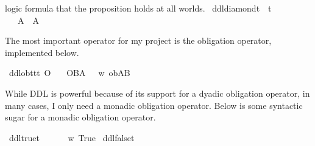 \begin{isabellebody}
{logic formula that the proposition holds at all worlds.%
}\isanewline
{}\isamarkupfalse%
\ ddldiamond{\isacharcolon}{\isacharcolon}{\isachardoublequoteopen}t\ {\isasymRightarrow}\ t{\isachardoublequoteclose}\ {\isacharparenleft}{\isachardoublequoteopen}{\isasymdiamond}{\isachardoublequoteclose}{\isacharparenright}\isanewline
\ \ \ {\isachardoublequoteopen}{\isasymdiamond}A\ {\isasymequiv}\ \isactrlbold {\isasymnot}{\isacharparenleft}{\isasymbox}{\isacharparenleft}\isactrlbold {\isasymnot}A{\isacharparenright}{\isacharparenright}{\isachardoublequoteclose}\isanewline
%
%
\begin{isamarkuptext}%
The most important operator for my project is the obligation operator, implemented below.%
\end{isamarkuptext}\isamarkuptrue%
\isamarkupfalse%
\ ddlob{\isacharcolon}{\isacharcolon}{\isachardoublequoteopen}t{\isasymRightarrow}t{\isasymRightarrow}t{\isachardoublequoteclose}\ {\isacharparenleft}{\isachardoublequoteopen}O{\isacharbraceleft}{\isacharunderscore}{\isacharbar}{\isacharunderscore}{\isacharbraceright}{\isachardoublequoteclose}{\isacharparenright}\isanewline
\ \ \ {\isachardoublequoteopen}O{\isacharbraceleft}B{\isacharbar}A{\isacharbraceright}\ {\isasymequiv}\ {\isasymlambda}\ w{\isachardot}\ ob{\isacharparenleft}A{\isacharparenright}{\isacharparenleft}B{\isacharparenright}{\isachardoublequoteclose}\isanewline
%
\isanewline
%
\begin{isamarkuptext}%
While DDL is powerful because of its support for a dyadic obligation operator, in many cases, 
I only need a monadic obligation operator. Below is some syntactic sugar for a monadic obligation operator.%
\end{isamarkuptext}\isamarkuptrue%
\isamarkupfalse%
\ ddltrue{\isacharcolon}{\isacharcolon}{\isachardoublequoteopen}t{\isachardoublequoteclose}\ {\isacharparenleft}{\isachardoublequoteopen}\isactrlbold {\isasymtop}{\isachardoublequoteclose}{\isacharparenright}\isanewline
\ \ \ {\isachardoublequoteopen}\isactrlbold {\isasymtop}\ {\isasymequiv}\ {\isasymlambda}w{\isachardot}\ True{\isachardoublequoteclose}\isanewline
{}\isamarkupfalse%
\ ddlfalse{\isacharcolon}{\isacharcolon}{\isachardoublequoteopen}t{\isachardoublequoteclose}\ {\isacharparenleft}{\isachardoublequoteopen}\isactrlbold {\isasymbottom}{\isachardoublequoteclose}{\isacharparenright}\isanewline

\end{isabellebody}
